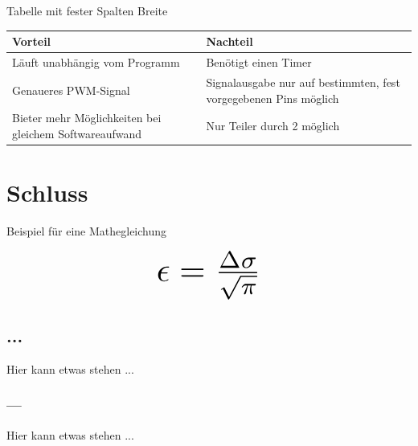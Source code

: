 \documentclass[a4paper, 12pt]{article}
\begin{document}
\subsubsection{~~}
Tabelle mit fester Spalten Breite

\bgroup
\def\arraystretch{1.5}
\begin{table}[!ht]
    \centering
    \begin{tabularx}{\textwidth}{X|X}
    Vorteil & Nachteil \\
    \hline
    Läuft unabhängig vom Programm & Benötigt einen Timer \\
    Genaueres PWM-Signal & Signalausgabe nur auf bestimmten, fest vorgegebenen Pins möglich\\
    Bieter mehr Möglichkeiten bei gleichem Softwareaufwand & Nur Teiler durch 2 möglich \\
    \end{tabularx}
    \label{tab:my_label}
\end{table}
\egroup

\newpage
\section{Schluss}
Beispiel für eine Mathegleichung

\begin{displaymath}
\scalebox{3}{$\epsilon = \frac{\Delta\sigma}{\sqrt{\pi}}$}
\end{displaymath}

\subsection{...}
Hier kann etwas stehen ...

\subsubsection{---}
Hier kann etwas stehen ...



\end{document}
